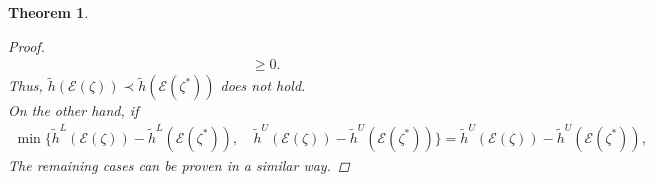 \documentclass[12pt, reqno]{amsart}
\newtheorem{theorem}{Theorem}[section]
\theoremstyle{definition}
\theoremstyle{remark}
\numberwithin{equation}{section}
\begin{document}
\begin{theorem}
\begin{proof}
\begin{equation*}
\begin{aligned}
&\geq 0.
    \end{aligned}
\end{equation*}
Thus, $\tilde{h}(\mathcal{\mathcal{E}}(\mathit{\zeta} )) \prec \tilde{h}(\mathcal{\mathcal{E}}(\mathit{\zeta}^*))$ does not hold.\\
On the other hand, if 
\begin{equation*}
    \begin{aligned}
        \min\{\tilde{h}^L(\mathcal{E}(\zeta)) - \tilde{h}^L(\mathcal{E}(\zeta^*)),~& \tilde{h}^U(\mathcal{E}(\zeta)) - \tilde{h}^U(\mathcal{E}(\zeta^*))\} = \tilde{h}^U(\mathcal{E}(\zeta)) - \tilde{h}^U(\mathcal{E}(\zeta^*)),
\end{aligned}
\end{equation*}
The remaining cases can be proven in a similar way.
   
  \end{proof}  
\end{theorem}
\end{document}
